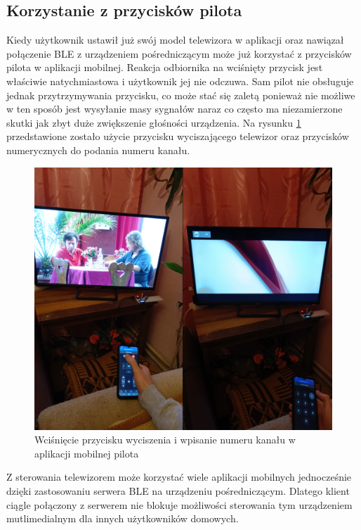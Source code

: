 \documentclass[12pt,twoside]{article}
\begin{document}
\subsection{Korzystanie z przycisków pilota}
Kiedy użytkownik ustawił już swój model telewizora w aplikacji oraz nawiązał połączenie BLE z urządzeniem pośredniczącym może już korzystać z przycisków pilota w aplikacji mobilnej. Reakcja odbiornika na wciśnięty przycisk jest właściwie natychmiastowa i użytkownik jej nie odczuwa. Sam pilot nie obsługuje jednak przytrzymywania przycisku, co może stać się zaletą ponieważ nie możliwe w ten sposób jest wysyłanie masy sygnałów naraz co często ma niezamierzone skutki jak zbyt duże zwiększenie głośności urządzenia. Na rysunku \ref*{Fig:buttonsTest} przedstawione zostało użycie przycisku wyciszającego telewizor oraz przycisków numerycznych do podania numeru kanału.

\begin{figure}[ht]
   \centering
   \includegraphics[width=13cm]{images/buttonsTest.png}
   \caption{Wciśnięcie przycisku wyciszenia i wpisanie numeru kanału w aplikacji mobilnej pilota}
   \label{Fig:buttonsTest}
\end{figure}

Z sterowania telewizorem może korzystać wiele aplikacji mobilnych jednocześnie dzięki zastosowaniu serwera BLE na urządzeniu pośredniczącym. Dlatego klient ciągle połączony z serwerem nie blokuje możliwości sterowania tym urządzeniem mutlimedialnym dla innych użytkowników domowych.
\end{document}
